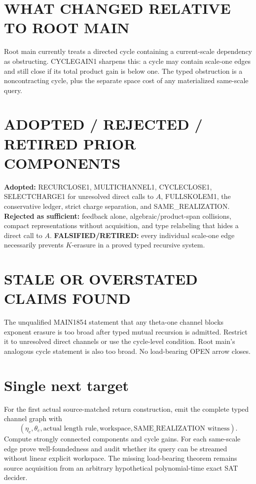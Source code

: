 \documentclass[11pt]{article}
\begin{document}
\section*{WHAT CHANGED RELATIVE TO ROOT MAIN}
Root main currently treats a directed cycle containing a current-scale dependency as obstructing. CYCLEGAIN1 sharpens this: a cycle may contain scale-one edges and still close if its total product gain is below one. The typed obstruction is a noncontracting cycle, plus the separate space cost of any materialized same-scale query.

\section*{ADOPTED / REJECTED / RETIRED PRIOR COMPONENTS}
\textbf{Adopted:} RECURCLOSE1, MULTICHANNEL1, CYCLECLOSE1, SELECTCHARGE1 for unresolved direct calls to \(A\), FULLSKOLEM1, the conservative ledger, strict charge separation, and SAME\_REALIZATION.
\textbf{Rejected as sufficient:} feedback alone, algebraic/product-span collisions, compact representations without acquisition, and type relabeling that hides a direct call to \(A\).
\textbf{FALSIFIED/RETIRED:} every individual scale-one edge necessarily prevents \(K\)-erasure in a proved typed recursive system.

\section*{STALE OR OVERSTATED CLAIMS FOUND}
The unqualified MAIN1854 statement that any theta-one channel blocks exponent erasure is too broad after typed mutual recursion is admitted. Restrict it to unresolved direct channels or use the cycle-level condition. Root main's analogous cycle statement is also too broad. No load-bearing OPEN arrow closes.

\section*{Single next target}
For the first actual source-matched return construction, emit the complete typed channel graph with
\[
(\eta_e,\theta_e,\text{actual length rule},\text{workspace},\text{SAME\_REALIZATION witness}).
\]
Compute strongly connected components and cycle gains. For each same-scale edge prove well-foundedness and audit whether its query can be streamed without linear explicit workspace. The missing load-bearing theorem remains source acquisition from an arbitrary hypothetical polynomial-time exact SAT decider.
\end{document}
